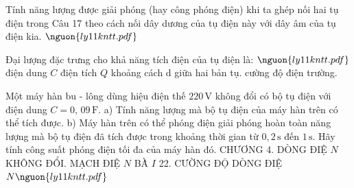

\begin{bt}
Tính năng lượng được giải phóng (hay công phóng điện) khi ta ghép nối hai tụ điện trong Câu 17 theo cách nối dây dương của tụ điện này với dây âm của tụ điện kia. $\nguon{ly11 kntt.pdf}$
\end{bt}

\begin{ex}
Đại lượng đặc trưng cho khả năng tích điện của tụ điện là: $\nguon{ly11 kntt.pdf}$
\choice
{\True điện dung $C$}
{điện tích $Q$}
{khoảng cách d giữa hai bản tụ.}
{cường độ điện trường.}
\end{ex}

\begin{ex}
Một máy hàn bu - lông dùng hiệu điện thế $220\,\mathrm{V}$ không đổi có bộ tụ điện với điện dung $C = 0$, $09\,\mathrm{F}$. a) Tính năng lượng mà bộ tụ điện của máy hàn trên có thể tích được. b) Máy hàn trên có thể phóng điện giải phóng hoàn toàn năng lượng mà bộ tụ điện đã tích được trong khoảng thời gian từ $0,2\,\mathrm{s}$ đến $1\,\mathrm{s}$. Hãy tính công suất phóng điện tối đa của máy hàn đó. CHƯƠNG 4. DÒNG ĐIỆ $N$ KHÔNG ĐỔI. MẠCH ĐIỆ $N$ BÀ̀ $I$ 22. CƯỜNG ĐỘ DÒNG ĐIỆ $N\nguon{ly11 kntt.pdf}$
\choiceTF

\end{ex}

